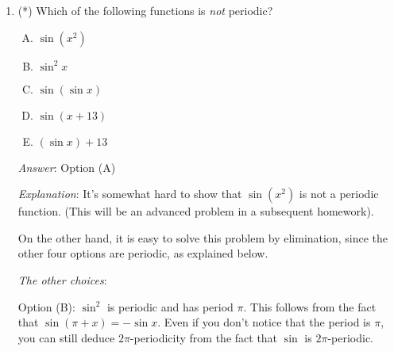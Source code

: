 \documentclass[10pt]{amsart}
\begin{document}
\begin{enumerate}
  {\em Additional remark}: If $f \circ g = g \circ f$, we say that the
  functions $f$ and $g$ {\em commute}. You may have heard about the
  commutativity law for addition and multiplication. In the case of
  function composition, commutativity is {\em not} a law. It holds for
  some pairs of functions (such as options (A), (B), (D), (E) here)
  and not for others (such as option (C)).

  Note that for the function $f(x) := -x$, a function $h$ commutes
  with $f$ if and only if $h$ is an odd function. Thus, in option (E),
  the cube map is an odd function. And option (D) fails because the
  square map is {\em not} an odd function.

  {\em Performance review}: Everybody($12$ out of $12$) got this
  correct.

  {\em Historical note (last year)}: $14$ out of $15$ people got this
  correct. $1$ person chose (B).

  {\em Action point}: Even if you got this correct, it may be helpful
  to try to understand how to more quickly see that for all the other
  pairs, $f \circ g = g \circ f$.

\item (*) Which of the following functions is {\em not} periodic?

  \begin{enumerate}[(A)]
  \item $\sin(x^2)$
  \item $\sin^2x$
  \item $\sin(\sin x)$
  \item $\sin(x + 13)$
  \item $(\sin x) + 13$
  \end{enumerate}

  {\em Answer}: Option (A)

  {\em Explanation}: It's somewhat hard to show that $\sin(x^2)$ is
  not a periodic function. (This will be an advanced problem in a
  subsequent homework).

  On the other hand, it is easy to solve this problem by elimination,
  since the other four options are periodic, as explained below.

  {\em The other choices}:

  Option (B): $\sin^2$ is periodic and has period $\pi$. This follows
  from the fact that $\sin(\pi + x) = -\sin x$. Even if you don't
  notice that the period is $\pi$, you can still deduce
  $2\pi$-periodicity from the fact that $\sin$ is $2\pi$-periodic.


\end{enumerate}
\end{document}
